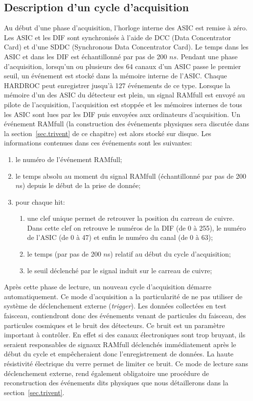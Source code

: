 \subsection{Description d'un cycle d'acquisition}
Au début d'une phase d'acquisition, l'horloge interne des ASIC est remise à zéro. Les ASIC et les DIF sont synchronisés à l'aide de DCC (Data Concentrator Card) et d'une SDDC (Synchronous Data Concentrator Card). Le temps dans les ASIC et dans les DIF est échantillonné par pas de 200 $ns$. Pendant une phase d'acquisition, lorsqu'un ou plusieurs des 64 canaux d'un ASIC passe le premier seuil, un événement est stocké dans la mémoire interne de l'ASIC. Chaque HARDROC peut enregistrer jusqu'à 127 événements de ce type. Lorsque la mémoire d'un des ASIC du détecteur est plein, un signal RAMfull est envoyé au pilote de l'acquisition, l'acquisition est stoppée et les mémoires internes de tous les ASIC sont lues par les DIF puis envoyées aux ordinateurs d’acquisition. Un événement RAMfull (la construction des événements physiques sera discutée dans la section~\ref{sec.trivent} de ce chapitre) est alors stocké sur disque. Les informations contenues dans ces événements sont les suivantes: 
\begin{enumerate}[1-]
\item le numéro de l'événement RAMfull;
\item le temps absolu au moment du signal RAMfull (échantillonné par pas de 200 $n$s) depuis le début de la prise de donnée;
\item pour chaque hit:
  \begin{enumerate}[-]
    \item une clef unique permet de retrouver la position du carreau de cuivre. Dans cette clef on retrouve le numéros de la DIF (de 0 à 255), le numéro de l'ASIC (de 0 à 47) et enfin le numéro du canal (de 0 à 63);
    \item le temps (par pas de 200 $n$s) relatif au début du cycle d'acquisition;
    \item le seuil déclenché par le signal induit sur le carreau de cuivre;
  \end{enumerate}
\end{enumerate}
Après cette phase de lecture, un nouveau cycle d'acquisition démarre automatiquement. Ce mode d'acquisition a la particularité de ne pas utiliser de système de déclenchement externe ({\it{trigger}}). Les données collectées en test faisceau, contiendront donc des événements venant de particules du faisceau, des particules cosmiques et le bruit des détecteurs. Ce bruit est un paramètre important à contrôler. En effet si des canaux électroniques sont trop bruyant, ils seraient responsables de signaux RAMfull déclenchés immédiatement après le début du cycle et empêcheraient donc l'enregistrement de données. La haute résistivité électrique du verre permet de limiter ce bruit. Ce mode de lecture sans déclenchement externe, rend également obligatoire une procédure de reconstruction des événements dits physiques que nous détaillerons dans la section~\ref{sec.trivent}.
\
